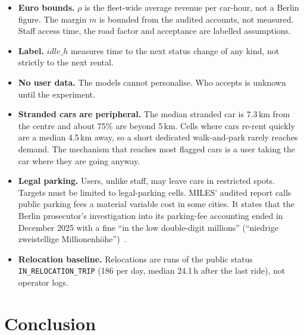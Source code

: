 \documentclass[11pt,a4paper]{article}
\begin{document}
\begin{itemize}
\item \textbf{Euro bounds.} $\rho$ is the fleet-wide average revenue per car-hour, not a Berlin figure. The margin $m$ is bounded from the audited accounts, not measured. Staff access time, the road factor and acceptance are labelled assumptions.
\item \textbf{Label.} $\mathit{idle\_h}$ measures time to the next status change of any kind, not strictly to the next rental.
\item \textbf{No user data.} The models cannot personalise. Who accepts is unknown until the experiment.
\item \textbf{Stranded cars are peripheral.} The median stranded car is 7.3\,km from the centre and about 75\% are beyond 5\,km. Cells where cars re-rent quickly are a median 4.5\,km away, so a short dedicated walk-and-park rarely reaches demand. The mechanism that reaches most flagged cars is a user taking the car where they are going anyway.
\item \textbf{Legal parking.} Users, unlike staff, may leave cars in restricted spots. Targets must be limited to legal-parking cells. MILES' audited report calls public parking fees a material variable cost in some cities. It states that the Berlin prosecutor's investigation into its parking-fee accounting ended in December 2025 with a fine ``in the low double-digit millions'' (``niedrige zweistellige Millionenh\"ohe'')~\citep{miles2024annual}.
\item \textbf{Relocation baseline.} Relocations are runs of the public status \texttt{IN\_RELOCATION\_TRIP} (186 per day, median 24.1\,h after the last ride), not operator logs.
\end{itemize}

\section{Conclusion}
\end{document}
